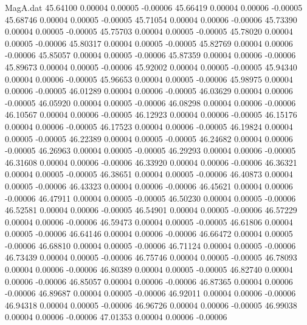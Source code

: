\begin{filecontents}{MagA.dat}
  45.64100    0.00004    0.00005   -0.00006
  45.66419    0.00004    0.00006   -0.00005
  45.68746    0.00004    0.00005   -0.00005
  45.71054    0.00004    0.00006   -0.00006
  45.73390    0.00004    0.00005   -0.00005
  45.75703    0.00004    0.00005   -0.00005
  45.78020    0.00004    0.00005   -0.00006
  45.80317    0.00004    0.00005   -0.00005
  45.82769    0.00004    0.00006   -0.00006
  45.85057    0.00004    0.00005   -0.00006
  45.87359    0.00004    0.00006   -0.00006
  45.89673    0.00004    0.00005   -0.00006
  45.92002    0.00004    0.00005   -0.00005
  45.94340    0.00004    0.00006   -0.00005
  45.96653    0.00004    0.00005   -0.00006
  45.98975    0.00004    0.00006   -0.00005
  46.01289    0.00004    0.00006   -0.00005
  46.03629    0.00004    0.00006   -0.00005
  46.05920    0.00004    0.00005   -0.00006
  46.08298    0.00004    0.00006   -0.00006
  46.10567    0.00004    0.00006   -0.00005
  46.12923    0.00004    0.00006   -0.00005
  46.15176    0.00004    0.00006   -0.00005
  46.17523    0.00004    0.00006   -0.00005
  46.19824    0.00004    0.00005   -0.00005
  46.22389    0.00004    0.00005   -0.00005
  46.24682    0.00004    0.00006   -0.00005
  46.26963    0.00004    0.00005   -0.00005
  46.29293    0.00004    0.00006   -0.00005
  46.31608    0.00004    0.00006   -0.00006
  46.33920    0.00004    0.00006   -0.00006
  46.36321    0.00004    0.00005   -0.00005
  46.38651    0.00004    0.00005   -0.00006
  46.40873    0.00004    0.00005   -0.00006
  46.43323    0.00004    0.00006   -0.00006
  46.45621    0.00004    0.00006   -0.00006
  46.47911    0.00004    0.00005   -0.00005
  46.50230    0.00004    0.00005   -0.00006
  46.52581    0.00004    0.00006   -0.00005
  46.54901    0.00004    0.00005   -0.00006
  46.57229    0.00004    0.00006   -0.00006
  46.59473    0.00004    0.00005   -0.00005
  46.61806    0.00004    0.00005   -0.00006
  46.64146    0.00004    0.00006   -0.00006
  46.66472    0.00004    0.00005   -0.00006
  46.68810    0.00004    0.00005   -0.00006
  46.71124    0.00004    0.00005   -0.00006
  46.73439    0.00004    0.00005   -0.00006
  46.75746    0.00004    0.00005   -0.00005
  46.78093    0.00004    0.00006   -0.00006
  46.80389    0.00004    0.00005   -0.00005
  46.82740    0.00004    0.00006   -0.00006
  46.85057    0.00004    0.00006   -0.00006
  46.87365    0.00004    0.00006   -0.00006
  46.89687    0.00004    0.00005   -0.00006
  46.92011    0.00004    0.00006   -0.00006
  46.94318    0.00004    0.00005   -0.00006
  46.96726    0.00004    0.00006   -0.00005
  46.99038    0.00004    0.00006   -0.00006
  47.01353    0.00004    0.00006   -0.00006

\end{filecontents}
